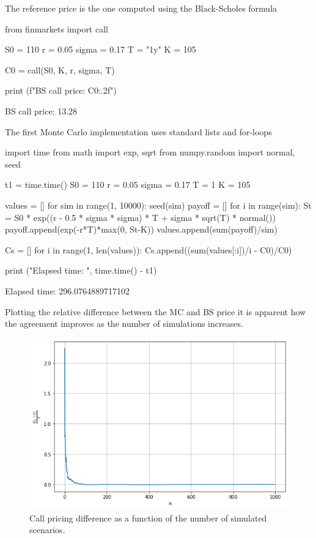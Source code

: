 \cprotEnv\begin{solution}
The reference price is the one computed using the Black-Scholes formula
\begin{ipython}
from finmarkets import call

S0 = 110
r = 0.05
sigma = 0.17
T = "1y"
K = 105

C0 = call(S0, K, r, sigma, T)

print (f"BS call price: {C0:.2f}")
\end{ipython}
\begin{ioutput}
BS call price: 13.28
\end{ioutput}

The first Monte Carlo implementation uses standard lists and for-loops
\begin{ipython}
import time
from math import exp, sqrt
from numpy.random import normal, seed

t1 = time.time()
S0 = 110
r = 0.05
sigma = 0.17
T = 1
K = 105

values = []
for sim in range(1, 10000):
  seed(sim)
  payoff = []
  for i in range(sim):
    St = S0 * exp((r - 0.5 * sigma * sigma) * T + sigma * sqrt(T) * normal())
    payoff.append(exp(-r*T)*max(0, St-K))
  values.append(sum(payoff)/sim)

Cs = []
for i in range(1, len(values)):
  Cs.append((sum(values[:i])/i - C0)/C0)

print ("Elapsed time: ", time.time() - t1)
\end{ipython}
\begin{ioutput}
Elapsed time:  296.0764889717102
\end{ioutput}

Plotting the relative difference between the MC and BS price it is apparent how the agreement improves as the number of simulations increases.

\begin{figure}[htbp]
\centering
\includegraphics[width=0.7\linewidth]{figures/ex_call_pricing_error}
\caption{Call pricing difference as a function of the number of simulated scenarios.}
\end{figure}


\end{solution}
